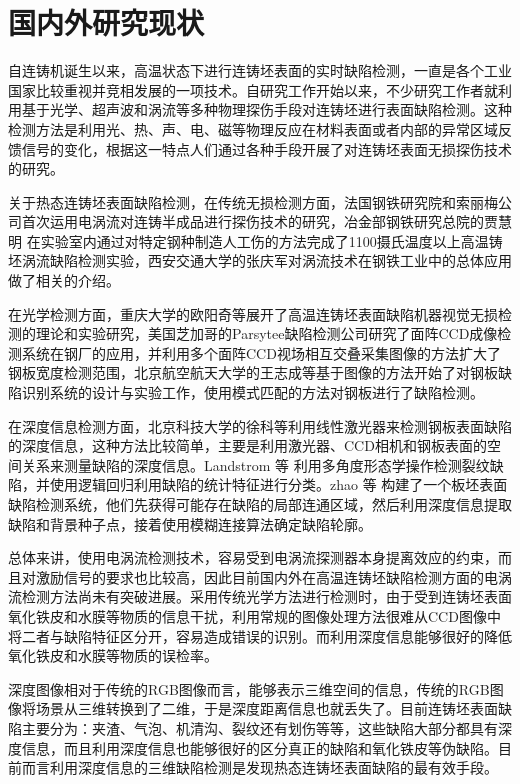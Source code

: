     \section{国内外研究现状}
    自连铸机诞生以来，高温状态下进行连铸坯表面的实时缺陷检测，一直是各个工业国家比较重视并竞相发展的一项技术。自研究工作开始以来，不少研究工作者就利用基于光学、超声波和涡流等多种物理探伤手段对连铸坯进行表面缺陷检测。这种检测方法是利用光、热、声、电、磁等物理反应在材料表面或者内部的异常区域反馈信号的变化，根据这一特点人们通过各种手段开展了对连铸坯表面无损探伤技术的研究。

    关于热态连铸坯表面缺陷检测，在传统无损检测方面，法国钢铁研究院和索丽梅公司首次运用电涡流对连铸半成品进行探伤技术的研究，冶金部钢铁研究总院的贾慧明\cite{贾慧明19941100} 在实验室内通过对特定钢种制造人工伤的方法完成了1100摄氏温度以上高温铸坯涡流缺陷检测实验，西安交通大学的张庆军\cite{张庆军2005涡流检测技术在钢铁工业中的新应用}对涡流技术在钢铁工业中的总体应用做了相关的介绍。

    在光学检测方面，重庆大学的欧阳奇等\cite{欧阳奇2007高温连铸坯表面缺陷的机器视觉无损检测}展开了高温连铸坯表面缺陷机器视觉无损检测的理论和实验研究，美国芝加哥的Parsytee缺陷检测公司研究了面阵CCD成像检测系统在钢厂的应用，并利用多个面阵CCD视场相互交叠采集图像的方法扩大了钢板宽度检测范围，北京航空航天大学的王志成等\cite{王志成2009钢板表面缺陷检测系统的设计与实现}基于图像的方法开始了对钢板缺陷识别系统的设计与实验工作，使用模式匹配的方法对钢板进行了缺陷检测。

    在深度信息检测方面，北京科技大学的徐科等\cite{徐科2008基于线型激光的热轧带钢表面在线检测系统}利用线性激光器来检测钢板表面缺陷的深度信息，这种方法比较简单，主要是利用激光器、CCD相机和钢板表面的空间关系来测量缺陷的深度信息。Landstrom 等\cite{Landstrom2012Morphology} 利用多角度形态学操作检测裂纹缺陷，并使用逻辑回归利用缺陷的统计特征进行分类。zhao 等\cite{Zhao2014Defect} 构建了一个板坯表面缺陷检测系统，他们先获得可能存在缺陷的局部连通区域，然后利用深度信息提取缺陷和背景种子点，接着使用模糊连接算法确定缺陷轮廓。

    总体来讲，使用电涡流检测技术，容易受到电涡流探测器本身提离效应的约束，而且对激励信号的要求也比较高，因此目前国内外在高温连铸坯缺陷检测方面的电涡流检测方法尚未有突破进展。采用传统光学方法进行检测时，由于受到连铸坯表面氧化铁皮和水膜等物质的信息干扰，利用常规的图像处理方法很难从CCD图像中将二者与缺陷特征区分开，容易造成错误的识别。而利用深度信息能够很好的降低氧化铁皮和水膜等物质的误检率。

    深度图像相对于传统的RGB图像而言，能够表示三维空间的信息，传统的RGB图像将场景从三维转换到了二维，于是深度距离信息也就丢失了。目前连铸坯表面缺陷主要分为：夹渣、气泡、机清沟、裂纹还有划伤等等，这些缺陷大部分都具有深度信息，而且利用深度信息也能够很好的区分真正的缺陷和氧化铁皮等伪缺陷。目前而言利用深度信息的三维缺陷检测是发现热态连铸坯表面缺陷的最有效手段。


